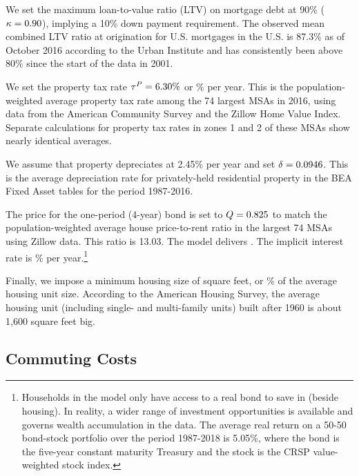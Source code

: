 \documentclass[letterpaper,12pt,dvipsnames,usenames]{article}
\theoremstyle{definition}
\begin{document}
\begin{spacing}{1.25}
We set the maximum loan-to-value ratio (LTV) on mortgage debt at 90\% ($\kappa=0.90$), implying a 10\% down payment requirement. The observed mean combined LTV ratio at origination for U.S. mortgages in the U.S. is 87.3\% as of October 2016 according to the Urban Institute and has consistently been above 80\% since the start of the data in 2001. %

We set the property tax rate $\tau^{P}={6.30}\%$ or {\tauPy}\% per year. This is the population-weighted average property tax rate among the 74 largest MSAs in 2016, using data from the American Community Survey and the Zillow Home Value Index. Separate calculations for property tax rates in zones 1 and 2 of these MSAs show nearly identical averages. %

We assume that property depreciates at 2.45\% per year and set $\delta={0.0946}$. This is the average depreciation rate for privately-held residential property in the BEA Fixed Asset tables for the period 1987-2016. %


The price for the one-period (4-year) bond is set to $Q={0.825}$ to match the population-weighted average house price-to-rent ratio in the largest 74 MSAs using Zillow data. This ratio is 13.03. The model delivers {\MedMktPHbyMedMktRent}. The implicit interest rate is {\ImInt}\% per year.\footnote{Households in the model only have access to a real bond to save in (beside housing). In reality, a wider range of investment opportunities is available and governs wealth accumulation in the data. The average real return on a 50-50 bond-stock portfolio over the period 1987-2018 is 5.05\%, where the bond is the five-year constant maturity Treasury and the stock is the CRSP value-weighted stock index.}

Finally, we impose a minimum housing size of {\HresMin} square feet, or {\HresMinbyHres}\% of the average housing unit size.  According to the American Housing Survey, the average housing unit (including single- and multi-family units) built after 1960 is about 1,600 square feet  big.

\subsection{Commuting Costs}


\end{spacing}
\end{document}
